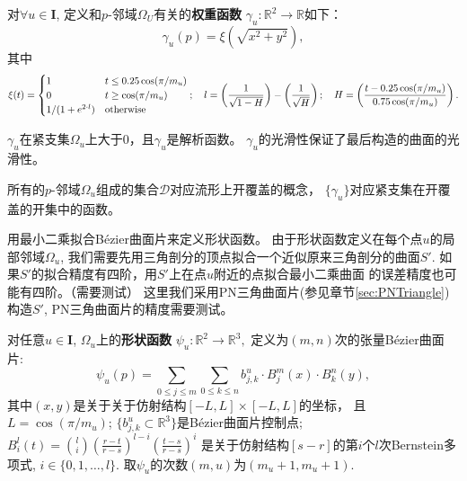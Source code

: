 \begin{defn}[权重函数]
  对$\forall u\in \mathbf{I}$,
  定义和$p$-邻域$\Omega_U$有关的\textbf{权重函数}
  $\gamma_u:\mathbb{R}^2\rightarrow\mathbb{R}$如下：
  \begin{equation}
      \gamma_u(p)=\xi(\sqrt{x^2+y^2}),
  \end{equation}
其中
\begin{equation}
  \xi(t)=
    \begin{cases}
      1 &t\leq 0.25\cos(\pi/m_u)\\
      0&t\geq \cos(\pi/m_u)\\
      1/(1+e^{2\cdot l}) &\textmd{otherwise}
    \end{cases};
    \quad
    l=\left(\frac{1}{\sqrt{1-H}}\right)-\left(\frac{1}{\sqrt{H}}\right);
    \quad 
  H=\left(\frac{t- 0.25\cos(\pi/m_u)}{ 0.75\cos(\pi/m_u)}\right).
\end{equation}
\end{defn}
\begin{rem}
  $\gamma_u$在紧支集$\Omega_u$上大于0，且$\gamma_u$是解析函数。
  $\gamma_u$的光滑性保证了最后构造的曲面的光滑性。
\end{rem}

\begin{rem}
  所有的$p$-邻域$\Omega_u$组成的集合$\mathscr{D}$对应流形上开覆盖的概念，
  $\{\gamma_u\}$对应紧支集在开覆盖的开集中的函数。
\end{rem}
\begin{rem}
  用最小二乘拟合Bézier曲面片来定义形状函数。
  由于形状函数定义在每个点$u$的局部邻域$\Omega_u$,
  我们需要先用三角剖分的顶点拟合一个近似原来三角剖分的曲面$S'$.
  如果$S'$的拟合精度有四阶，用$S'$上在点$u$附近的点拟合最小二乘曲面
  的误差精度也可能有四阶。（需要测试）
  这里我们采用PN三角曲面片(参见章节\ref{sec:PNTriangle})
  构造$S'$,
  PN三角曲面片的精度需要测试。
\end{rem}

\begin{defn}
  \label{defn:shape}
  对任意$u\in \mathbf{I}$,
  $\Omega_u$上的\textbf{形状函数}
  $\psi_u:\mathbb{R}^2\rightarrow \mathbb{R}^3,$
  定义为$(m,n)$次的张量Bézier曲面片:
  \begin{equation}
    \label{eq:Bézier}
    \psi_u(p)=\sum_{0\leq j\leq m}\sum_{0\leq k\leq n}
    b^u_{j,k}\cdot B_j^m(x)\cdot B_k^n(y),
  \end{equation}
  其中$(x,y)$是关于关于仿射结构$[-L,L]\times [-L,L]$的坐标，
  且$L=\cos(\pi/m_u)$;
  $\{b_{j,k}^u\subset \mathbb{R}^3\}$是Bézier曲面片控制点;
  $B^l_i(t)=\binom{l}{i}\left(\frac{r-t}{r-s}\right)^{l-i}
  \left(\frac{t-s}{r-s}\right)^{i}$
  是关于仿射结构$[s-r]$的第$i$个$l$次Bernstein多项式,
  $i\in \{0,1,\ldots,l\}$.
  取$\psi_u$的次数$(m,u)$为$(m_u+1,m_u+1)$.
\end{defn}

